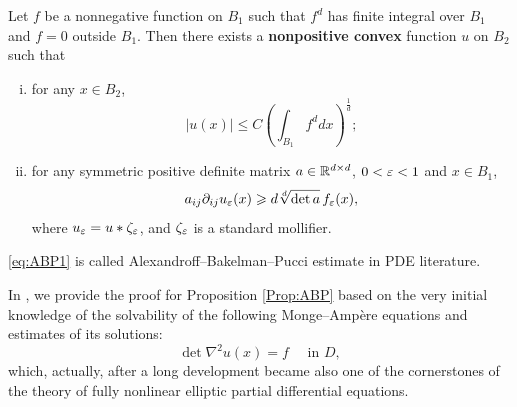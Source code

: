  
\begin{proposition}[Alexsandroff]\label{Prop:ABP}
    Let $f$ be a nonnegative function on $B_1$ such that $f^d$ has finite integral over $B_1$ and $f=0$ outside $B_1$. Then there exists a {\bf nonpositive  convex} function $u$ on $B_2$ such that
    \begin{enumerate}[(i)]
        \item  for any $x\in B_2$,
        \begin{equation}\label{eq:ABP1}
            |u(x)| \leq C \left(\int_{B_1} f^d d x\right)^{\frac{1}{d}}; 
	\end{equation}
        \item for any symmetric positive definite matrix $a\in {\mathbb R}^{d\times d}$, $0<\varepsilon<1$ and $x\in B_1$, 
	\begin{equation}
            a_{ij}\partial_{ij} u_{\varepsilon}(x)\geqslant d \sqrt[d]{\det a} \, f_{\varepsilon}(x), 
	\end{equation}
        where $u_\varepsilon= u*\zeta_\varepsilon$, and $\zeta_\varepsilon$ is a standard mollifier. 
    \end{enumerate}
\end{proposition}

\eqref{eq:ABP1} is called Alexandroff–Bakelman–Pucci estimate in PDE literature. 
	
\medspace
	
In , we provide the proof for Proposition \ref{Prop:ABP} based on the very initial knowledge of the solvability of the following Monge–Ampère equations and estimates of its solutions: 
	\begin{equation}\label{eq:MAE}
		\det \nabla^2 u(x)=f\quad \mbox{ in } D, 
	\end{equation}
	which, actually, after a long development became also one of the cornerstones of the theory of fully nonlinear elliptic partial differential equations. 
	
